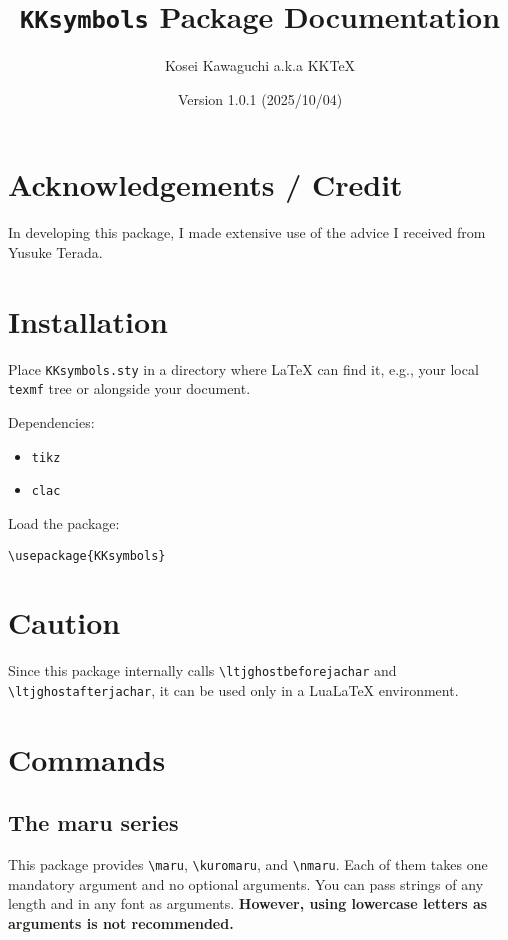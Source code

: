 \documentclass[luatex,fontsize=10pt,paper=b5,twoside]{jlreq}%
\title{\texttt{KKsymbols} Package Documentation}
\author{Kosei Kawaguchi a.k.a KKTeX}
\date{Version 1.0.1 (2025/10/04)}
\begin{document}
\begin{titlepage}
  \maketitle
\end{titlepage}
\newpage
\tableofcontents
\newpage

\section{Acknowledgements / Credit}
In developing this package, I made extensive use of the advice I received from Yusuke Terada.

\section{Installation}
Place \texttt{KKsymbols.sty} in a directory where LaTeX can find it, e.g., your local \texttt{texmf} tree or alongside your document.

Dependencies:
\begin{itemize}
    \item \texttt{tikz}
    \item \texttt{clac}
\end{itemize}

Load the package:

\begin{verbatim}
\usepackage{KKsymbols}
\end{verbatim}

\section{Caution}
Since this package internally calls \verb|\ltjghostbeforejachar| and \verb|\ltjghostafterjachar|, it can be used only in a LuaLaTeX environment.

\section{Commands}
\subsection{The maru series}
This package provides \verb|\maru|, \verb|\kuromaru|, and \verb|\nmaru|. Each of them takes one mandatory argument and no optional arguments. You can pass strings of any length and in any font as arguments. \textbf{However, using lowercase letters as arguments is not recommended.}
\end{document}
